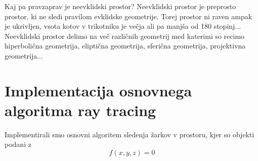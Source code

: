 \documentclass[titlepage]{article}
\begin{document}
Kaj pa pravzaprav je neevklidski prostor?
Neevklidski prostor je preprosto prostor, ki ne sledi pravilom evklidske geometrije. Torej prostor ni raven ampak je ukrivljen, vsota kotov v trikotniku je večja ali pa manjša od 180 stopinj... Neevklidski prostor delimo na več različnih geometrij med katerimi so recimo hiperbolična geometrija, eliptična geometrija, sferična geometrija, projektivna geometrija...

\section{Implementacija osnovnega algoritma ray tracing}
Implementirali smo osnovni algoritem sledenja žarkov v prostoru, kjer so objekti podani z
\begin{equation}
    f(x,y,z)=0
\end{equation}
\end{document}
